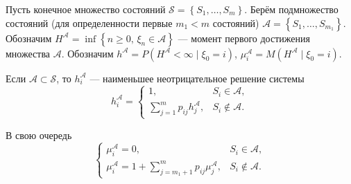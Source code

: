 \begin{definition}
  Пусть конечное множество состояний $\mathscr S = \left\{ S_1, \dots, S_m \right\} $. Берём подмножество 
  состояний (для определенности первые $m_1 < m$ состояний)
  $\mathscr A = \left\{ S_1, \dots, S_{m_1} \right\} $.
  Обозначим $H^{\mathscr A} = \inf \left\{ n\geqslant 0,\, \xi_n \in \mathscr A \right\} $ --- момент первого достижения 
  множества $\mathscr A$.
  Обозначим $h^{\mathscr A} = P(H^{\mathscr A} < \infty \mid \xi_0 = i)$,
  $\mu^{\mathscr A}_i = M(H^{\mathscr A} \mid \xi_0 = i)$.
\end{definition}

\begin{theorem}
  Если $\mathscr A \subset \mathscr S$, то $h_i^{\mathscr A}$ --- наименьшее неотрицательное решение системы
  \[
    h^{\mathscr A}_i = \begin{cases}
      1, & S_i \in \mathscr A, \\
      \sum\limits_{j=1}^m p_{ij} h_j^{\mathscr A}, &S_i \notin \mathscr A.
    \end{cases}
  \]
  
  В свою очередь
  \[
    \begin{cases}
      \mu^{\mathscr A}_i = 0, &S_i \in \mathscr A,\\
  \mu^{\mathscr A}_i = 1 + \!\!\!\!\sum\limits_{j=m_1+1}^{m} p_{ij} \mu_j^{\mathscr A},
                              &S_i \notin
  \mathscr A.
    \end{cases}
  \]
\end{theorem}
